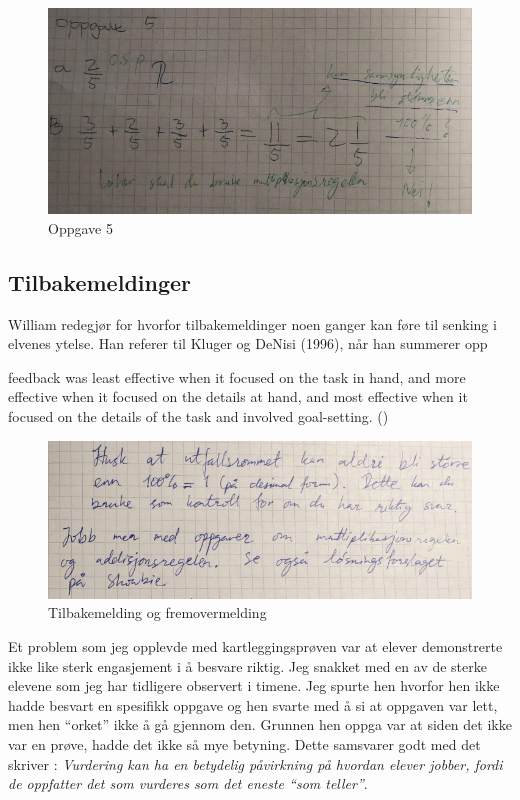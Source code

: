 \documentclass[main.tex]{subfiles}
\begin{document}
\begin{figure}
\centering
\includegraphics[scale = 0.4]{../figures/mohsin.png}
\caption{Oppgave 5}
\label{fig:mohsin}
\end{figure}


\subsection*{Tilbakemeldinger}

William redegjør for hvorfor tilbakemeldinger noen ganger kan føre til senking 
i elvenes ytelse. Han referer til Kluger og DeNisi (1996), når han summerer opp 
\begin{displayquote}
\textelp{} feedback was least effective when it focused on the task in hand, 
and more effective when it focused on the details at hand, and most effective 
when it focused on the details of the task and involved goal-setting.
()
\end{displayquote}

\begin{figure}
\centering
\includegraphics[scale = 0.4]{../figures/mohsin2.png}
\caption{Tilbakemelding og fremovermelding}
\label{fig:mohsin2}
\end{figure}

Et problem som jeg opplevde med kartleggingsprøven var at elever demonstrerte ikke like sterk engasjement
i å besvare riktig. Jeg snakket med en av de sterke elevene som jeg har tidligere observert i timene.
Jeg spurte hen hvorfor hen ikke hadde besvart en spesifikk oppgave og hen svarte med å si at oppgaven 
var lett, men hen ``orket'' ikke å gå gjennom den. Grunnen hen oppga var at siden det ikke var en prøve,
hadde det ikke så mye betyning. Dette samsvarer godt med det  skriver : \emph{Vurdering 
kan ha en betydelig påvirkning på hvordan elever jobber, fordi de oppfatter det som vurderes som det eneste
``som teller''}.
\end{document}
